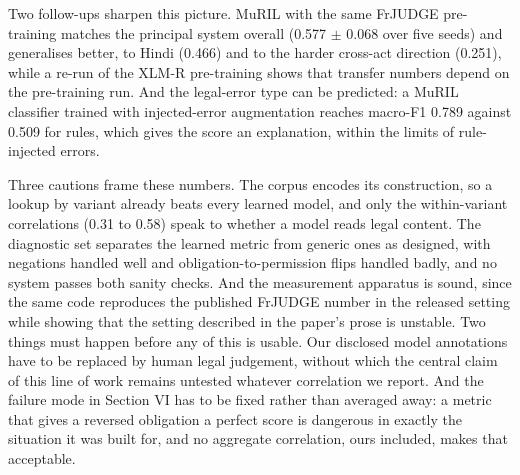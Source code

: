 \documentclass[conference]{IEEEtran}
\begin{document}
Two follow-ups sharpen this picture. MuRIL with the same FrJUDGE pre-training matches the principal system overall (0.577 \ensuremath{\pm} 0.068 over five seeds) and generalises better, to Hindi (0.466) and to the harder cross-act direction (0.251), while a re-run of the XLM-R pre-training shows that transfer numbers depend on the pre-training run. And the legal-error type can be predicted: a MuRIL classifier trained with injected-error augmentation reaches macro-F1 0.789 against 0.509 for rules, which gives the score an explanation, within the limits of rule-injected errors.

Three cautions frame these numbers. The corpus encodes its construction, so a lookup by variant already beats every learned model, and only the within-variant correlations (0.31 to 0.58) speak to whether a model reads legal content. The diagnostic set separates the learned metric from generic ones as designed, with negations handled well and obligation-to-permission flips handled badly, and no system passes both sanity checks. And the measurement apparatus is sound, since the same code reproduces the published FrJUDGE number in the released setting while showing that the setting described in the paper's prose is unstable. Two things must happen before any of this is usable. Our disclosed model annotations have to be replaced by human legal judgement, without which the central claim of this line of work remains untested whatever correlation we report. And the failure mode in Section VI has to be fixed rather than averaged away: a metric that gives a reversed obligation a perfect score is dangerous in exactly the situation it was built for, and no aggregate correlation, ours included, makes that acceptable.
\end{document}
